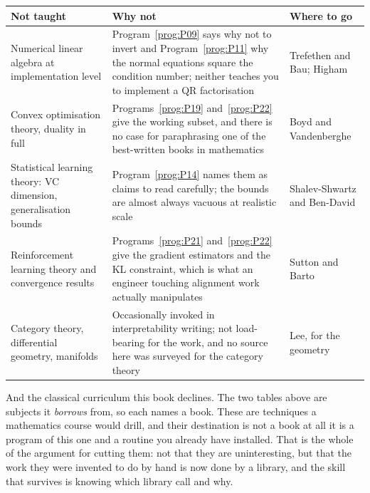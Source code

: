 \begin{center}
\begin{tabularx}{\linewidth}{@{}XXl@{}}
\toprule
\textbf{Not taught} & \textbf{Why not} & \textbf{Where to go} \\
\midrule
Numerical linear algebra at implementation level & Program~\ref{prog:P09} says
  why not to invert and Program~\ref{prog:P11} why the normal equations square
  the condition number; neither teaches you to implement a QR factorisation &
  Trefethen and Bau; Higham \\
Convex optimisation theory, duality in full & Programs~\ref{prog:P19}
  and~\ref{prog:P22} give the working subset, and there is no case for
  paraphrasing one of the best-written books in mathematics & Boyd and
  Vandenberghe \\
Statistical learning theory: VC dimension, generalisation bounds &
  Program~\ref{prog:P14} names them as claims to read carefully; the bounds are
  almost always vacuous at realistic scale & Shalev-Shwartz and Ben-David \\
Reinforcement learning theory and convergence results &
  Programs~\ref{prog:P21} and~\ref{prog:P22} give the gradient estimators and
  the KL constraint, which is what an engineer touching alignment work actually
  manipulates & Sutton and Barto \\
Category theory, differential geometry, manifolds & Occasionally invoked in
  interpretability writing; not load-bearing for the work, and no source here
  was surveyed for the category theory & Lee, for the geometry \\
\bottomrule
\end{tabularx}
\end{center}

\medskip
And the classical curriculum this book declines. The two tables above are
subjects it \emph{borrows} from, so each names a book. These are techniques a
mathematics course would drill, and their destination is not a book at all
\dash{} it is a program of this one and a routine you already have installed.
That is the whole of the argument for cutting them: not that they are
uninteresting, but that the work they were invented to do by hand is now done
by a library, and the skill that survives is knowing which library call and
why.

